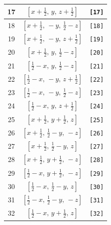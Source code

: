 \documentclass[fleqn,8pt]{jsarticle}
\begin{document}
\begin{longtable}{ccc}
17 & $\left[ x + \frac{1}{2},\, y,\, z + \frac{1}{2} \right]$ & {\tt [17]} \\ \hline
18 & $\left[ x + \frac{1}{2},\, - y,\, \frac{1}{2} - z \right]$ & {\tt [18]} \\ \hline
19 & $\left[ x + \frac{1}{2},\, - y,\, z + \frac{1}{2} \right]$ & {\tt [19]} \\ \hline
20 & $\left[ x + \frac{1}{2},\, y,\, \frac{1}{2} - z \right]$ & {\tt [20]} \\ \hline
21 & $\left[ \frac{1}{2} - x,\, y,\, \frac{1}{2} - z \right]$ & {\tt [21]} \\ \hline
22 & $\left[ \frac{1}{2} - x,\, - y,\, z + \frac{1}{2} \right]$ & {\tt [22]} \\ \hline
23 & $\left[ \frac{1}{2} - x,\, - y,\, \frac{1}{2} - z \right]$ & {\tt [23]} \\ \hline
24 & $\left[ \frac{1}{2} - x,\, y,\, z + \frac{1}{2} \right]$ & {\tt [24]} \\ \hline
25 & $\left[ x + \frac{1}{2},\, y + \frac{1}{2},\, z \right]$ & {\tt [25]} \\ \hline
26 & $\left[ x + \frac{1}{2},\, \frac{1}{2} - y,\, - z \right]$ & {\tt [26]} \\ \hline
27 & $\left[ x + \frac{1}{2},\, \frac{1}{2} - y,\, z \right]$ & {\tt [27]} \\ \hline
28 & $\left[ x + \frac{1}{2},\, y + \frac{1}{2},\, - z \right]$ & {\tt [28]} \\ \hline
29 & $\left[ \frac{1}{2} - x,\, y + \frac{1}{2},\, - z \right]$ & {\tt [29]} \\ \hline
30 & $\left[ \frac{1}{2} - x,\, \frac{1}{2} - y,\, z \right]$ & {\tt [30]} \\ \hline
31 & $\left[ \frac{1}{2} - x,\, \frac{1}{2} - y,\, - z \right]$ & {\tt [31]} \\ \hline
32 & $\left[ \frac{1}{2} - x,\, y + \frac{1}{2},\, z \right]$ & {\tt [32]} \\
\end{longtable}
\end{document}
